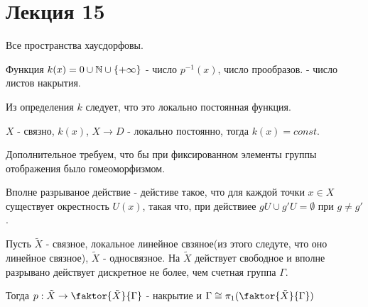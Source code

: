 \section{Лекция 15}

Все пространства хаусдорфовы.

\begin{definition}
    Функция $k(x) = 0 \cup \mathbb{N} \cup \{+\infty\}$ - число $p^{-1}(x)$, число прообразов. - число листов накрытия.
\end{definition}

\begin{exercise}
    Из определения $k$ следует, что это локально постоянная функция. 
\end{exercise}

\begin{exercise}
    $X$ - связно, $k(x)$, $X \rightarrow D$ - локально постоянно, тогда $k(x) = const$.
\end{exercise}

\begin{definition}
    Дополнительное требуем, что бы при фиксированном элементы группы отображения было гомеоморфизмом. 
\end{definition}

\begin{definition}
    Вполне разрываное действие - дейстиве такое, что для каждой точки $x \in X$ существует окрестность $U(x)$, такая что, при действиее $gU \cup g'U = \emptyset$ при $g \neq g'$.
\end{definition}

\begin{theorem}
    Пусть $\tilde{X}$ - связное, локальное линейное свзяное(из этого следуте, что оно линейное связное), $\tilde{X}$ - односвязное. На $\tilde{X}$ действует свободное и вполне разрывано действует дискретное не более, чем счетная группа $\Gamma$.

    Тогда $p: \tilde{X} \rightarrow \faktor{\tilde{X}}{\Gamma}$ - накрытие и $\Gamma \cong \pi_1(\faktor{\tilde{X}}{\Gamma})$
\end{theorem}


